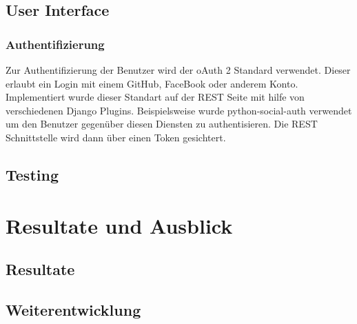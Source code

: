 %
%


\section{User Interface}
\subsection{Authentifizierung}
Zur Authentifizierung der Benutzer wird der oAuth 2 Standard verwendet. Dieser erlaubt ein Login mit einem GitHub, FaceBook oder anderem Konto. Implementiert wurde dieser Standart auf der REST Seite mit hilfe von verschiedenen Django Plugins. 
Beispielsweise wurde python-social-auth verwendet um den Benutzer gegenüber diesen Diensten zu authentisieren. Die REST Schnittstelle wird dann über einen Token gesichtert.


\section{Testing}


\chapter{Resultate und Ausblick}

\section{Resultate}


\section{Weiterentwicklung}


